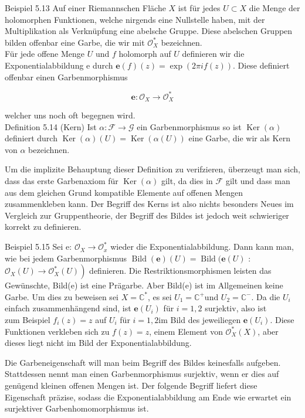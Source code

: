 \documentclass[10pt, letterpaper]{article}
\begin{document}
Beispiel 5.13 Auf einer Riemannschen Fläche $X$ ist für jedes $U \subset X$ die Menge der holomorphen Funktionen, welche nirgends eine Nullstelle haben, mit der Multiplikation als Verknüpfung eine abelsche Gruppe. Diese abelschen Gruppen bilden offenbar eine Garbe, die wir mit $\mathcal{O}_{X}^{*}$ bezeichnen.\\
Für jede offene Menge $U$ und $f$ holomorph auf $U$ definieren wir die Exponentialabbildung e durch $\mathbf{e}(f)(z)=\exp (2 \pi i f(z))$. Diese definiert offenbar einen Garbenmorphismus

$$
\mathbf{e}: \mathcal{O}_{X} \rightarrow \mathcal{O}_{X}^{*}
$$

welcher uns noch oft begegnen wird.\\
Definition 5.14 (Kern) Ist $\alpha: \mathcal{F} \rightarrow \mathcal{G}$ ein Garbenmorphismus so ist $\operatorname{Ker}(\alpha)$ definiert durch $\operatorname{Ker}(\alpha)(U)=\operatorname{Ker}(\alpha(U))$ eine Garbe, die wir als Kern von $\alpha$ bezeichnen.

Um die implizite Behauptung dieser Definition zu verifzieren, überzeugt man sich, dass das erste Garbenaxiom für $\operatorname{Ker}(\alpha)$ gilt, da dies in $\mathcal{F}$ gilt und dass man aus dem gleichen Grund kompatible Elemente auf offenen Mengen zusammenkleben kann. Der Begriff des Kerns ist also nichts besonders Neues im Vergleich zur Gruppentheorie, der Begriff des Bildes ist jedoch weit schwieriger korrekt zu definieren.

Beispiel 5.15 Sei e: $\mathcal{O}_{X} \rightarrow \mathcal{O}_{x}^{*}$ wieder die Exponentialabbildung. Dann kann man, wie bei jedem Garbenmorphismus $\operatorname{Bild}(\mathbf{e})(U)=\operatorname{Bild}(\mathbf{e}(U)$ : $\left.\mathcal{O}_{X}(U) \rightarrow \mathcal{O}_{X}^{*}(U)\right)$ definieren. Die Restriktionsmorphismen leisten das Gewünschte, Bild(e) ist eine Prägarbe. Aber Bild(e) ist im Allgemeinen keine Garbe. Um dies zu beweisen sei $X=\mathbb{C}^{*}$, es sei $U_{1}=\mathbb{C}^{+}$und $U_{2}=\mathbb{C}^{-}$. Da die $U_{i}$ einfach zusammenhängend sind, ist $\mathbf{e}\left(U_{i}\right)$ für $i=1,2$ surjektiv, also ist\\
zum Beispiel $f_{i}(z)=z$ auf $U_{i}$ für $i=1,2 \mathrm{im}$ Bild des jeweiliegen $\mathbf{e}\left(U_{i}\right)$. Diese Funktionen verkleben sich zu $f(z)=z$, einem Element von $\mathcal{O}_{X}^{*}(X)$, aber dieses liegt nicht im Bild der Exponentialabbildung.

Die Garbeneigenschaft will man beim Begriff des Bildes keinesfalls aufgeben. Stattdessen nennt man einen Garbenmorphismus surjektiv, wenn er dies auf genügend kleinen offenen Mengen ist. Der folgende Begriff liefert diese Eigenschaft präzise, sodass die Exponentialabbildung am Ende wie erwartet ein surjektiver Garbenhomomorphismus ist.
\end{document}
